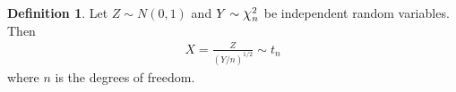 \documentclass[12pt]{article}
\theoremstyle{plain}
\theoremstyle{definition}
\newtheorem{defn}[thm]{Definition}
\theoremstyle{remark}
\newcommand*{\Chi}{\mbox{\large$\chi$}} %
\begin{document}
\begin{defn}
Let $Z\sim N(0,1)$ and $Y\sim \Chi^2_n$ be independent random variables.
Then
\begin{align*}
  X = \frac{Z}{(Y/n)^{1/2}}
  \sim t_n
\end{align*}
where $n$ is the degrees of freedom.
\end{defn}
\end{document}
